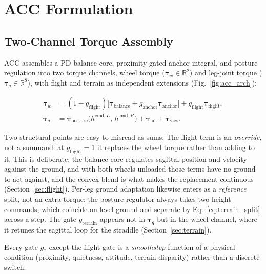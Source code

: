 \documentclass[a4paper,fleqn]{cas-dc}
\begin{document}
\section{ACC Formulation}

\subsection{Two-Channel Torque Assembly}
\label{sec:overview}

ACC assembles a PD balance core, proximity-gated anchor integral, and posture regulation into two torque channels, wheel torque ($\boldsymbol{\tau}_w\in\mathbb{R}^2$) and leg-joint torque ($\boldsymbol{\tau}_q\in\mathbb{R}^8$), with flight and terrain as independent extensions (Fig.~\ref{fig:acc_arch}):

\begin{equation}
\begin{aligned}
\boldsymbol{\tau}_w &= (1-g_{\text{flight}})\!\big[\boldsymbol{\tau}_{\text{balance}} + g_{\text{anchor}}\boldsymbol{\tau}_{\text{anchor}}\big] + g_{\text{flight}}\boldsymbol{\tau}_{\text{flight}},\\
\boldsymbol{\tau}_q &= \boldsymbol{\tau}_{\text{posture}}\big(h^{\text{cmd},L},\,h^{\text{cmd},R}\big) + \boldsymbol{\tau}_{\text{lat}} + \boldsymbol{\tau}_{\text{yaw}}.
\end{aligned}
\label{eq:two_channel}
\end{equation}

Two structural points are easy to misread as sums.
The flight term is an \emph{override}, not a summand: at $g_{\text{flight}}{=}1$ it replaces the wheel torque rather than adding to it. This is deliberate: the balance core regulates sagittal position and velocity against the ground, and with both wheels unloaded those terms have no ground to act against, and the convex blend is what makes the replacement continuous (Section~\ref{sec:flight}).
Per-leg ground adaptation likewise enters as a \emph{reference} split, not an extra torque: the posture regulator always takes two height commands, which coincide on level ground and separate by Eq.~\eqref{eq:terrain_split} across a step. The gate $g_{\text{terrain}}$ appears not in $\boldsymbol{\tau}_q$ but in the wheel channel, where it retunes the sagittal loop for the straddle (Section~\ref{sec:terrain}).

Every gate $g_*$ except the flight gate is a \emph{smoothstep} function of a physical condition (proximity, quietness, attitude, terrain disparity) rather than a discrete switch:
\end{document}

